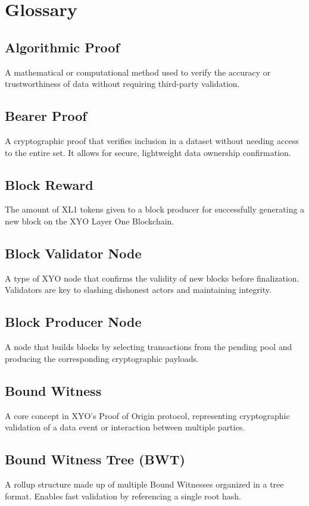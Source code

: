 \documentclass{article}
\begin{document}
\newpage

\section*{Glossary}

\subsection*{Algorithmic Proof}
A mathematical or computational method used to verify the accuracy or trustworthiness of data without requiring third-party validation.

\subsection*{Bearer Proof}
A cryptographic proof that verifies inclusion in a dataset without needing access to the entire set. It allows for secure, lightweight data ownership confirmation.

\subsection*{Block Reward}
The amount of XL1 tokens given to a block producer for successfully generating a new block on the XYO Layer One Blockchain.

\subsection*{Block Validator Node}
A type of XYO node that confirms the validity of new blocks before finalization. Validators are key to slashing dishonest actors and maintaining integrity.

\subsection*{Block Producer Node}
A node that builds blocks by selecting transactions from the pending pool and producing the corresponding cryptographic payloads.

\subsection*{Bound Witness}
A core concept in XYO’s Proof of Origin protocol, representing cryptographic validation of a data event or interaction between multiple parties.

\subsection*{Bound Witness Tree (BWT)}
A rollup structure made up of multiple Bound Witnesses organized in a tree format. Enables fast validation by referencing a single root hash.
\end{document}
